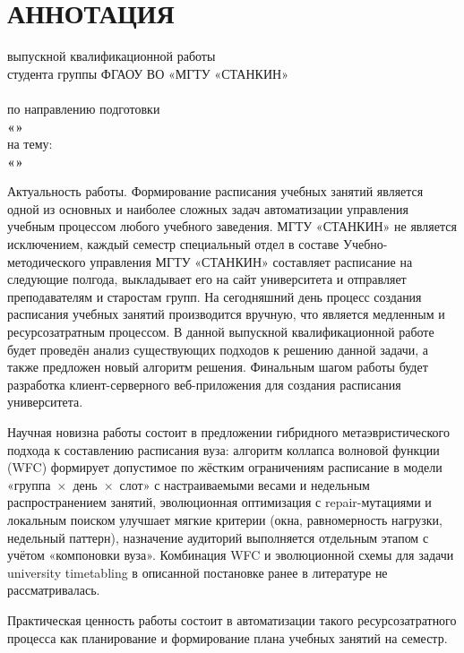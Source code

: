 \section*{АННОТАЦИЯ}

\begin{center}
	выпускной квалификационной работы \\
	студента группы \vkrStudentGroup\space ФГАОУ ВО «МГТУ «СТАНКИН» \\
	\textbf{\vkrStudentR} \\
	по направлению подготовки \\
	\textbf{\vkrMajor «\vkrMajorName»} \\
	на тему: \\
	\textbf{«\vkrTheme»}

\end{center}

Актуальность работы. Формирование расписания учебных занятий является одной из основных и наиболее сложных задач автоматизации управления учебным процессом любого учебного заведения. МГТУ «СТАНКИН» не является исключением, каждый семестр специальный отдел в составе Учебно-методического управления МГТУ «СТАНКИН» \cite{stankin:schedule} составляет расписание на следующие полгода, выкладывает его на сайт университета и отправляет преподавателям и старостам групп. На сегодняшний день процесс создания расписания учебных занятий производится вручную, что является медленным и ресурсозатратным процессом. В данной выпускной квалификационной работе будет проведён анализ существующих подходов к решению данной задачи, а также предложен новый алгоритм решения. Финальным шагом работы будет разработка клиент-серверного веб-приложения для создания расписания университета.

Научная новизна работы состоит в предложении гибридного метаэвристического подхода к составлению расписания вуза: алгоритм коллапса волновой функции (WFC) формирует допустимое по жёстким ограничениям расписание в модели «группа~$\times$~день~$\times$~слот» с настраиваемыми весами и недельным распространением занятий, эволюционная оптимизация с repair-мутациями и локальным поиском улучшает мягкие критерии (окна, равномерность нагрузки, недельный паттерн), назначение аудиторий выполняется отдельным этапом с учётом «компоновки вуза». Комбинация WFC и эволюционной схемы для задачи university timetabling в описанной постановке ранее в литературе не рассматривалась.

Практическая ценность работы состоит в автоматизации такого ресурсозатратного процесса как планирование и формирование плана учебных занятий на семестр.

